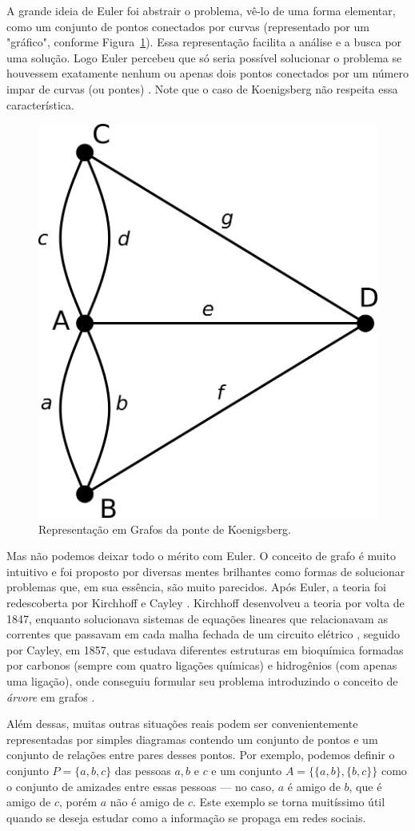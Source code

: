 \documentclass[a4paper,12pt]{article}
\begin{document}
A grande ideia de Euler foi abstrair o problema, vê-lo de uma forma elementar, como um conjunto de pontos conectados por curvas (representado por um "gráfico", conforme Figura~\ref{fig:koniGrafo}). Essa representação facilita a análise e a busca por uma solução. Logo Euler percebeu que só seria possível solucionar o problema se houvessem exatamente nenhum ou apenas dois pontos conectados por um número impar de curvas (ou pontes) \cite{euler:KOENIGSBERG}. Note que o caso de Koenigsberg não respeita essa característica.

\begin{figure}[H]
	\begin{center}
		\includegraphics[width=0.35\linewidth]{koenigsbernGrafo.png}
	\end{center}
	\caption{Representação em Grafos da ponte de Koenigsberg.}
	\label{fig:koniGrafo}
\end{figure}

Mas não podemos deixar todo o mérito com Euler. O conceito de grafo é muito intuitivo e foi proposto por diversas mentes brilhantes como formas de solucionar problemas que, em sua essência, são muito parecidos. Após Euler, a teoria foi redescoberta por Kirchhoff e Cayley \cite{graphTheoryFHarary}. Kirchhoff desenvolveu a teoria por volta de 1847, enquanto solucionava sistemas de equações lineares que relacionavam as correntes que passavam em cada malha fechada de um circuito elétrico \cite{kirchhoff1847ueber}, seguido por Cayley, em 1857, que estudava diferentes estruturas em bioquímica formadas por carbonos (sempre com quatro ligações químicas) e hidrogênios (com apenas uma ligação), onde conseguiu formular seu problema introduzindo o conceito de \textit{árvore} em grafos \cite{cayley1897theory}.  

Além dessas, muitas outras situações reais podem ser convenientemente representadas por simples diagramas contendo um conjunto de pontos e um conjunto de relações entre pares desses pontos. Por exemplo, podemos definir o conjunto $P = \{a,b,c\}$ das pessoas $a, b$ e $c$ e um conjunto $A = \{\{a,b\}, \{b,c\}\}$ como o conjunto de amizades entre essas pessoas --- no caso, $a$ é amigo de $b$, que é amigo de $c$, porém $a$ não é amigo de $c$. 
Este exemplo se torna muitíssimo útil quando se deseja estudar como a informação se propaga em redes sociais.
\end{document}
